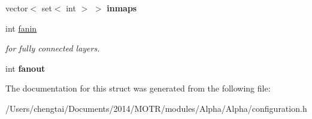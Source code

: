 \begin{DoxyCompactItemize}
\item 
\hypertarget{struct_config_a095d32cd326378d067389be47e85ea82}{vector$<$ set$<$ int $>$ $>$ {\bfseries inmaps}}\label{struct_config_a095d32cd326378d067389be47e85ea82}

\item 
\hypertarget{struct_config_afb439e83ef17afef86cc30f5caa2f433}{int \hyperlink{struct_config_afb439e83ef17afef86cc30f5caa2f433}{fanin}}\label{struct_config_afb439e83ef17afef86cc30f5caa2f433}

\begin{DoxyCompactList}\small\item\em for fully connected layers. \end{DoxyCompactList}\item 
\hypertarget{struct_config_a53c21449d6147fbd7023f158e109cb4d}{int {\bfseries fanout}}\label{struct_config_a53c21449d6147fbd7023f158e109cb4d}

\end{DoxyCompactItemize}


The documentation for this struct was generated from the following file\+:\begin{DoxyCompactItemize}
\item 
/\+Users/chengtai/\+Documents/2014/\+M\+O\+T\+R/modules/\+Alpha/\+Alpha/configuration.\+h\end{DoxyCompactItemize}
